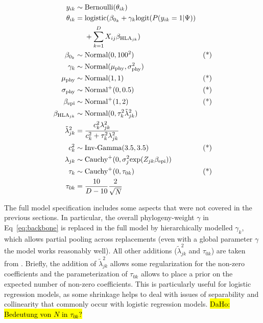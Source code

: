\documentclass{bioinfo}
\begin{document}
\begin{methods}
\begin{equation}
  \label{eq:full}
  \begin{aligned}
   y_{ik} &\sim \text{Bernoulli}(\theta_{ik}) &\\
   \theta_{ik} &=
        \text{logistic}(\beta_{0_{k}} + \gamma_{k}\text{logit}(P(y_{ik}=1|\Psi)) & \\
        \hspace{-6cm} &~~~~ +\sum_{k=1}^{D}X_{ij}\beta_{\text{HLA}_{jk}}) & \\
    \beta_{0_{k}} &\sim \text{Normal}(0, 100^2) & \text{(*)}\\
   \gamma_{k} &\sim \text{Normal}(\mu_{\text{phy}}, \sigma_{\text{phy}}^2) & \\
    \mu_{\text{phy}} &\sim \text{Normal}(1, 1) & \text{(*)} \\
   \sigma_{\text{phy}} &\sim \text{Normal}^{+}(0, 0.5) & \text{(*)} \\
   \beta_{\text{epi}} &\sim \text{Normal}^{+}(1, 2) & \text{(*)} \\
   \beta_{\text{HLA}_{jk}} &\sim \text{Normal}(0, \tau_{k}^{2}\tilde{\lambda}^{2}_{jk}) & \\
   \tilde{\lambda}^{2}_{jk} &= \frac{c_{k}^{2}\lambda_{jk}^{2}}{c_{k}^{2} + \tau_{k}^{2}\lambda_{jk}^{2}} & \\
    c_{k}^2 &\sim \text{Inv-Gamma}(3.5, 3.5) & \text{(*)} \\
   \lambda_{jk} &\sim \text{Cauchy}^{+}(0, \sigma_{j}^2\text{exp}(Z_{jk}\beta_{\text{epi}})) & \\
   \tau_{k} &\sim \text{Cauchy}^{+}(0, \tau_{0k}) & \text{(*)} \\
   \tau_{0k} &= \frac{10}{D-10}\frac{2}{\sqrt{N}} & \\
  \end{aligned}
\end{equation}

The full model specification includes some aspects that were not covered in the previous sections. In particular, the overall phylogeny-weight $\gamma$ in Eq~\ref{eq:backbone} is replaced in the full model by  hierarchically modelled  \(\gamma_{k}\), which allows partial pooling across replacements (even with a global parameter \(\gamma\) the model works reasonably well). All other additions (\(\tilde{\lambda}_{jk}^{2}\) and \(\tau_{0k}\)) are taken from \citet{Piironen2017}. Briefly, the addition of  \(\tilde{\lambda}_{jk}^{2}\) allows some regularization for the non-zero coefficients and the parameterization of \(\tau_{0k}\) allows to place a prior on the expected number of non-zero coefficients.  This is particularly useful for logistic regression models, as some shrinkage helps to deal with issues of separability and collinearity that commonly occur with logistic regression models. \hl{DaHo: Bedeutung von $N$ in $\tau_{0k}$?}


\end{methods}
\end{document}
